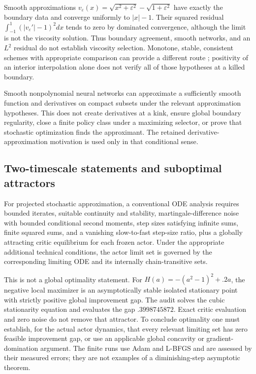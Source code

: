 Smooth approximations
$v_\varepsilon(x)=\sqrt{x^2+\varepsilon^2}-\sqrt{1+\varepsilon^2}$
have exactly the boundary data and converge uniformly to $|x|-1$. Their squared residual $\int_{-1}^1(|v_\varepsilon'|-1)^2dx$ tends to zero by dominated convergence, although the limit is not the viscosity solution. Thus boundary agreement, smooth networks, and an $L^2$ residual do not establish viscosity selection. Monotone, stable, consistent schemes with appropriate comparison can provide a different route \citep{barles1991}; positivity of an interior interpolation alone does not verify all of those hypotheses at a killed boundary.

Smooth nonpolynomial neural networks can approximate a sufficiently smooth function and derivatives on compact subsets under the relevant approximation hypotheses. This does not create derivatives at a kink, ensure global boundary regularity, close a finite policy class under a maximizing selector, or prove that stochastic optimization finds the approximant. The retained derivative-approximation motivation is used only in that conditional sense.

\subsection{Two-timescale statements and suboptimal attractors}
For projected stochastic approximation, a conventional ODE analysis requires bounded iterates, suitable continuity and stability, martingale-difference noise with bounded conditional second moments, step sizes satisfying infinite sums, finite squared sums, and a vanishing slow-to-fast step-size ratio, plus a globally attracting critic equilibrium for each frozen actor. Under the appropriate additional technical conditions, the actor limit set is governed by the corresponding limiting ODE and its internally chain-transitive sets.

This is not a global optimality statement. For $H(a)=-(a^2-1)^2+.2a$, the negative local maximizer is an asymptotically stable isolated stationary point with strictly positive global improvement gap. The audit solves the cubic stationarity equation and evaluates the gap $.3998745872$. Exact critic evaluation and zero noise do not remove that attractor. To conclude optimality one must establish, for the actual actor dynamics, that every relevant limiting set has zero feasible improvement gap, or use an applicable global concavity or gradient-domination argument. The finite runs use Adam and L-BFGS and are assessed by their measured errors; they are not examples of a diminishing-step asymptotic theorem.

